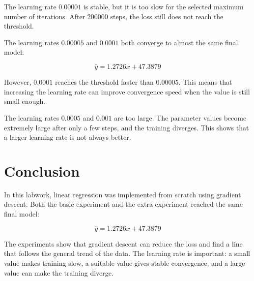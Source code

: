\documentclass[12pt,a4paper]{article}
\begin{document}
The learning rate \(0.00001\) is stable, but it is too slow for the selected maximum number of iterations. After 200000 steps, the loss still does not reach the threshold.

The learning rates \(0.00005\) and \(0.0001\) both converge to almost the same final model:

\[
\hat{y} = 1.2726x + 47.3879
\]

However, \(0.0001\) reaches the threshold faster than \(0.00005\). This means that increasing the learning rate can improve convergence speed when the value is still small enough.

The learning rates \(0.0005\) and \(0.001\) are too large. The parameter values become extremely large after only a few steps, and the training diverges. This shows that a larger learning rate is not always better.

\section{Conclusion}

In this labwork, linear regression was implemented from scratch using gradient descent.
Both the basic experiment and the extra experiment reached the same final model:

\[
\hat{y} = 1.2726x + 47.3879
\]

The experiments show that gradient descent can reduce the loss and find a line that follows the general trend of the data. The learning rate is important: a small value makes training slow, a suitable value gives stable convergence, and a large value can make the training diverge.
\end{document}
